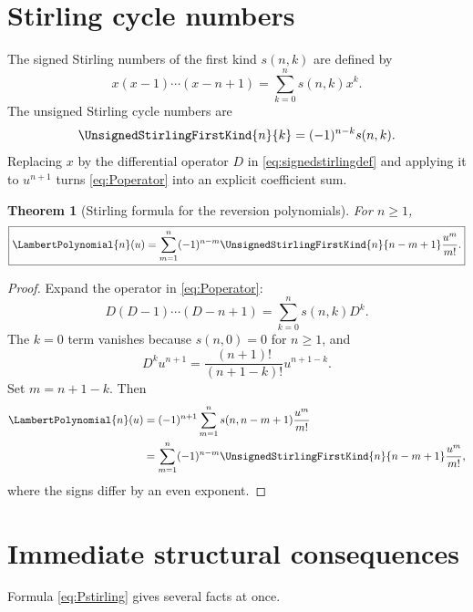 \documentclass[11pt,oneside,openany]{book}
\newtheorem{theorem}{Theorem}[chapter]
\begin{document}
\section{Stirling cycle numbers}
The signed Stirling numbers of the first kind \(s(n,k)\) are defined by
\begin{equation}\label{eq:signedstirlingdef}
 x(x-1)\cdots(x-n+1)=\sum_{k=0}^{n}s(n,k)x^k.
\end{equation}
The unsigned Stirling cycle numbers are
\begin{equation}\label{eq:unsignedstirling}
 \UnsignedStirlingFirstKind{n}{k}=(-1)^{n-k}s(n,k).
\end{equation}
Replacing \(x\) by the differential operator \(D\) in
\cref{eq:signedstirlingdef} and applying it to \(u^{n+1}\) turns
\cref{eq:Poperator} into an explicit coefficient sum.

\begin{theorem}[Stirling formula for the reversion polynomials]
\label{thm:Pstirling}
For \(n\geq1\),
\begin{equation}\label{eq:Pstirling}
 \boxed{
 \LambertPolynomial{n}(u)=\sum_{m=1}^{n}
 (-1)^{n-m}\UnsignedStirlingFirstKind{n}{n-m+1}\frac{u^m}{m!}.
 }
\end{equation}
\end{theorem}

\begin{proof}
Expand the operator in \cref{eq:Poperator}:
\[
 D(D-1)\cdots(D-n+1)=\sum_{k=0}^{n}s(n,k)D^k.
\]
The \(k=0\) term vanishes because \(s(n,0)=0\) for \(n\geq1\), and
\[
 D^ku^{n+1}=\frac{(n+1)!}{(n+1-k)!}u^{n+1-k}.
\]
Set \(m=n+1-k\).  Then
\begin{align*}
 \LambertPolynomial{n}(u)
 &=(-1)^{n+1}
   \sum_{m=1}^{n}s(n,n-m+1)\frac{u^m}{m!}\\
 &=\sum_{m=1}^{n}
   (-1)^{n-m}\UnsignedStirlingFirstKind{n}{n-m+1}\frac{u^m}{m!},
\end{align*}
where the signs differ by an even exponent.
\end{proof}

\section{Immediate structural consequences}
Formula \cref{eq:Pstirling} gives several facts at once.
\end{document}
